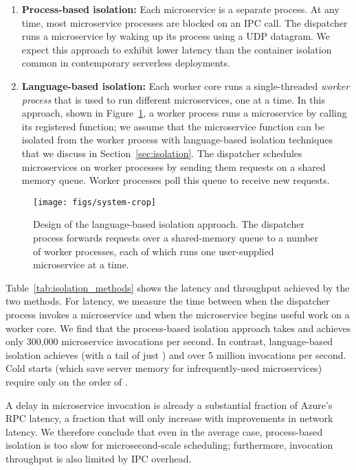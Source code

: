 \begin{enumerate}
\item \textbf{Process-based isolation:} Each microservice is a separate process.
At any time, most microservice processes are blocked on an IPC
call. The dispatcher runs a microservice by waking up its process using a UDP datagram.
We expect this approach to exhibit lower latency than the container isolation common
in contemporary serverless deployments.
\item \textbf{Language-based isolation:} Each worker core runs a single-threaded
\emph{worker process} that is used to run different microservices, one at a time.
In this approach, shown in Figure~\ref{fig:sysdesign}, a worker process runs a
microservice by calling its registered
function; we assume that the microservice function can be isolated from the
worker process with language-based isolation techniques that we discuss in
Section~\ref{sec:isolation}. The dispatcher schedules microservices on worker
processes by sending them
requests on a shared memory queue. Worker processes poll this queue to receive
new requests.
\end{enumerate}

\begin{figure}
\texttt{[image: figs/system-crop]}
\caption{Design of the language-based isolation approach.  The dispatcher process
forwards requests over a shared-memory queue to a number of worker processes, each of
which runs one user-supplied microservice at a time.}
\label{fig:sysdesign}
\end{figure}

Table~\ref{tab:isolation_methods} shows the latency and throughput achieved
by the two methods. For latency, we measure the time between when the dispatcher
process invokes a microservice and when the microservice begins
useful work on a worker core. We find that the process-based isolation approach
takes  and achieves only 300,000 microservice invocations per
second. In contrast, language-based isolation achieves  (with a tail
of just ) and over 5 million invocations per second.  Cold starts
(which save server memory for infrequently-used microservices)
require only on the order of .

A  delay in microservice invocation is already a substantial fraction of
Azure's  RPC latency, a fraction that will only increase with
improvements in network latency. We therefore conclude that even in the average case,
process-based isolation is too slow for microsecond-scale scheduling; furthermore,
invocation throughput is also limited by IPC overhead.

